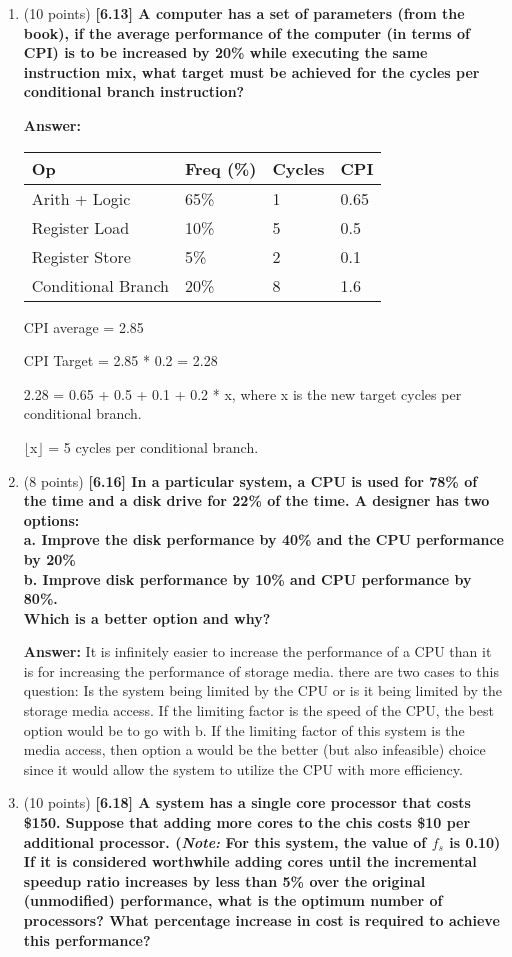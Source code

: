 \documentclass[letterpaper,10pt,onecolumn,titlepage]{article}
\begin{document}
\begin{enumerate}
\item (10 points) \textbf{[6.13] A computer has a set of parameters (from the book), if the average performance of the computer (in terms of CPI) is to be increased by 20\% while executing the same instruction mix, what target must be achieved for the cycles per conditional branch instruction?}

\textbf{Answer:} 

\begin{tabular}{| l | l | l | l |}
    \hline
    Op & Freq (\%) & Cycles & CPI\\ \hline
    Arith + Logic & 65\% & 1 & 0.65\\ \hline
    Register Load & 10\% & 5 & 0.5\\ \hline
    Register Store & 5\% & 2 & 0.1\\ \hline
    Conditional Branch & 20\% & 8 & 1.6\\ \hline
\end{tabular}
    CPI average = 2.85

    CPI Target = 2.85 * 0.2 = 2.28

    2.28 = 0.65 + 0.5 + 0.1 + 0.2 * x, where x is the new target cycles per conditional branch.

    $\lfloor$x$\rfloor$ = 5 cycles per conditional branch.



\item (8 points) \textbf{[6.16] In a particular system, a CPU is used for 78\% of the time and a disk drive for 22\% of the time. A designer has two options: \\
a. Improve the disk performance by 40\% and the CPU performance by 20\%\\
b. Improve disk performance by 10\% and CPU performance by 80\%.\\
Which is a better option and why?}

\textbf{Answer:} It is infinitely easier to increase the performance of a CPU than it is for increasing the performance of storage media. there are two cases to this question: Is the system being limited by the CPU or is it being limited by the storage media access. If the limiting factor is the speed of the CPU, the best option would be to go with b. If the limiting factor of this system is the media access, then option a would be the better (but also infeasible) choice since it would allow the system to utilize the CPU with more efficiency.
\newpage

\item (10 points) \textbf{[6.18] A system has a single core processor that costs \$150. Suppose that adding more cores to the chis costs \$10 per additional processor. (\textit{Note:} For this system, the value of $f_s$ is 0.10) If it is considered worthwhile adding cores until the incremental speedup ratio increases by less than 5\% over the original (unmodified) performance, what is the optimum number of processors? What percentage increase in cost is required to achieve this performance?}


\end{enumerate}
\end{document}
